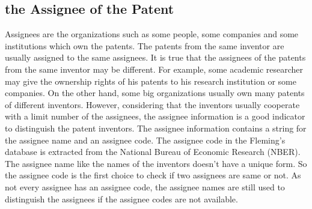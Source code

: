 

\subsection{the Assignee of the Patent}
Assignees are the organizations such as some people, some companies and some institutions which own the patents. The patents from the same inventor are usually assigned to the same assignees. It is true that the assignees of the patents from the same inventor may be different. For example, some academic researcher may give the ownership rights of his patents to his research institution or some companies. On the other hand, some big organizations usually own many patents of different inventors. However, considering that the inventors usually cooperate with a limit number of the assignees, the assignee information is a good indicator to distinguish the patent inventors. The assignee information contains a string for the assignee name and an assignee code. The assignee code in the Fleming's database is extracted from the National Bureau of Economic Research (NBER). The assignee name like the names of the inventors doesn't have a unique form. So the assignee code is the first choice to check if two assignees are same or not. As not every assignee has an assignee code, the assignee names are still used to distinguish the assignees if the assignee codes are not available.  


